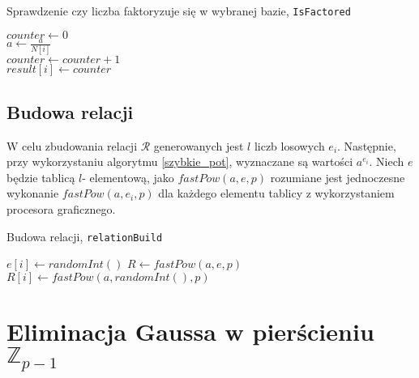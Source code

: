 \documentclass[]{article}
\begin{document}
		\begin{algorithm}[H]
			\SetAlgoLined
			\caption{Sprawdzenie czy liczba faktoryzuje się w wybranej bazie, \texttt{IsFactored}}
			\label{factor_alt}
			{
				\(counter \gets 0\) \\
				{
					\(a \gets \frac{a}{N[i]}\) \\
					\(counter \gets counter + 1\) \\
				}
				\(result[i] \gets counter\) \\
			}
			{
			}
			\Else
			{
			}
			
			
		\end{algorithm}
		
	\subsection{Budowa relacji}
		W celu zbudowania relacji \(\mathcal{R}\) generowanych jest \(l\) liczb losowych \(e_i\). Następnie, przy wykorzystaniu algorytmu \ref{szybkie_pot}, wyznaczane są wartości \(a^{e_i}\). 
		\newline
		Niech \(e\) będzie tablicą \(l\)- elementową, jako \(fastPow(a, e, p)\) rozumiane jest jednoczesne wykonanie \(fastPow(a, e_i, p)\) dla każdego elementu tablicy z wykorzystaniem procesora graficznego. 
		\newline
		\begin{algorithm}[H]
			\SetAlgoLined
			\caption{Budowa relacji, \texttt{relationBuild}}
			\label{relation}
			{
				\(e[i] \gets randomInt()\)
			}
			\(R \gets fastPow(a, e, p)\) \\
			{
				{
					\(R[i] \gets fastPow(a, randomInt(), p)\)
				}
			}
		
		\end{algorithm}


\newpage
\section{Eliminacja Gaussa w pierścieniu \(\mathbb{Z}_{p-1}\)}
\end{document}
